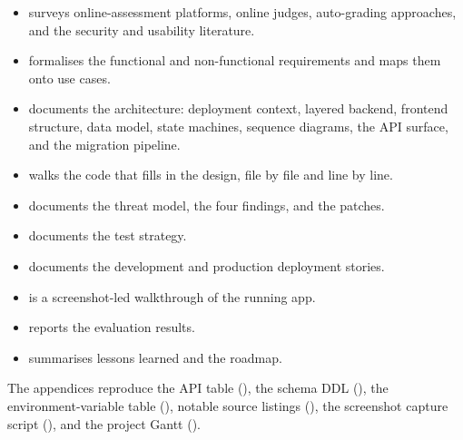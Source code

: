\begin{itemize}
  \item {} surveys online-assessment platforms, online judges, auto-grading approaches, and the security and usability literature.
  \item {} formalises the functional and non-functional requirements and maps them onto use cases.
  \item {} documents the architecture: deployment context, layered backend, frontend structure, data model, state machines, sequence diagrams, the API surface, and the migration pipeline.
  \item {} walks the code that fills in the design, file by file and line by line.
  \item {} documents the threat model, the four findings, and the patches.
  \item {} documents the test strategy.
  \item {} documents the development and production deployment stories.
  \item {} is a screenshot-led walkthrough of the running app.
  \item {} reports the evaluation results.
  \item {} summarises lessons learned and the roadmap.
\end{itemize}

The appendices reproduce the API table (), the schema DDL (), the environment-variable table (), notable source listings (), the screenshot capture script (), and the project Gantt ().
